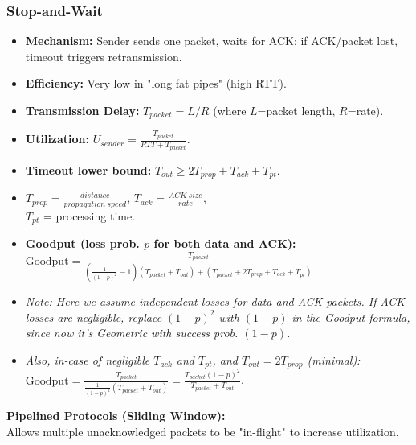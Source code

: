 \subsubsection{Stop-and-Wait}
\begin{itemize}
    \item \textbf{Mechanism:} Sender sends one packet, waits for ACK; if ACK/packet lost, timeout triggers retransmission.
    \item \textbf{Efficiency:} Very low in "long fat pipes" (high RTT). 
    \item \textbf{Transmission Delay:} $T_{packet} = L/R$ (where $L$=packet length, $R$=rate).
    \item \textbf{Utilization:} $U_{sender} = \frac{T_{packet}}{RTT + T_{packet}}$.
    \item \textbf{Timeout lower bound:} $T_{out} \ge 2T_{prop} + T_{ack} + T_{pt}$.
    \item $T_{prop} = \frac{distance}{propagation\ speed}$, $T_{ack} = \frac{ACK\ size}{rate}$, \\ $T_{pt}$ = processing time.
    \item \textbf{Goodput (loss prob. $p$ for both data and ACK):} $\text{Goodput} = \frac{T_{packet}}{\left(\frac{1}{(1-p)^2}-1\right)(T_{packet}+T_{out})+\left(T_{packet}+2T_{prop}+T_{ack}+T_{pt}\right)}$
    \item[] \textit{Note: Here we assume independent losses for data and ACK packets. If ACK losses are negligible, replace $(1-p)^2$ with $(1-p)$ in the Goodput formula, since now it's Geometric with success prob. $(1-p)$.}
    \item[] \textit{Also, in-case of negligible $T_{ack}$ and $T_{pt}$, and $T_{out} = 2T_{prop}$ (minimal):} $\text{Goodput} = \frac{T_{packet}}{\frac{1}{(1-p)^2}(T_{packet}+T_{out})} = \frac{T_{packet}(1-p)^2}{T_{packet}+T_{out}}$.
\end{itemize}

\textbf{Pipelined Protocols (Sliding Window):} \\
Allows multiple unacknowledged packets to be "in-flight" to increase utilization.
